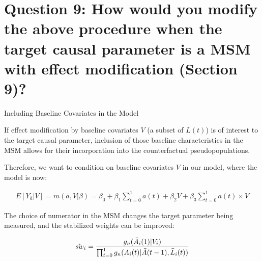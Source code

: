 \documentclass[ignorenonframetext,]{beamer}
\begin{document}
\section{Question 9: How would you modify the above procedure when the
target causal parameter is a MSM with effect modification (Section
9)?}\label{question-9-how-would-you-modify-the-above-procedure-when-the-target-causal-parameter-is-a-msm-with-effect-modification-section-9}

\begin{frame}{Including Baseline Covariates in the Model}

\vspace{3mm} If effect modification by baseline covariates \(V\) (a
subset of \(L(t)\)) is of interest to the target causal parameter,
inclusion of those baseline characteristics in the MSM allows for their
incorporation into the counterfactual pseudopopulations.

\vspace{3mm} Therefore, we want to condition on baseline covariates
\(V\) in our model, where the model is now: \vspace{-6mm}

\begin{align*}
E[Y_{\bar{a}}|V] = m(\bar{a},V|\beta) = \beta_0 + \beta_1\sum_{t=0}^1a(t) + \beta_2V + \beta_3\sum_{t=0}^1a(t) \times V
\end{align*}

\vspace{3mm} The choice of numerator in the MSM changes the target
parameter being measured, and the stabilized weights can be improved:
\vspace{-5mm}

\begin{align*}
\hat{sw}_\mathnormal{i} = \frac{g_n(\bar{A}_\mathnormal{i}(1)|V_i)}{\prod_{t=0}^1g_n(A_\mathnormal{i}(t)|\bar{A}(t-1), \bar{L}_\mathnormal{i}(t))}\\
\end{align*}

\end{frame}
\end{document}
